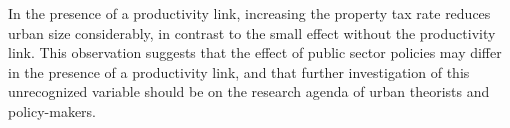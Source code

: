 In the presence of a productivity link, increasing the property tax rate reduces urban size considerably, in contrast to the small effect without the productivity link. This observation suggests that the effect of public sector policies may differ in the presence of a productivity link, and that further investigation of this unrecognized variable should be on the research agenda of urban theorists and policy-makers.

